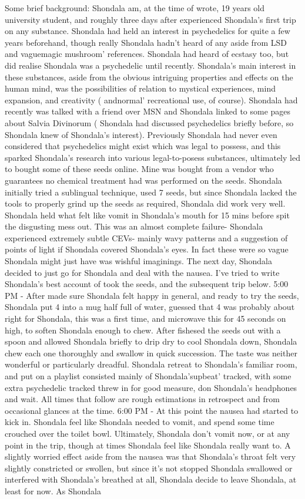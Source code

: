 \documentclass[12pt]{book}
\begin{document}
Some brief background: Shondala am, at the time of wrote, 19 years old university student, and roughly three days after experienced Shondala's first trip on any substance. Shondala had held an interest in psychedelics for quite a few years beforehand, though really Shondala hadn't heard of any aside from LSD and vaguemagic mushroom' references. Shondala had heard of ecstasy too, but did realise Shondala was a psychedelic until recently. Shondala's main interest in these substances, aside from the obvious intriguing properties and effects on the human mind, was the possibilities of relation to mystical experiences, mind expansion, and creativity ( andnormal' recreational use, of course). Shondala had recently was talked with a friend over MSN and Shondala linked to some pages about Salvia Divinorum ( Shondala had discussed psychedelics briefly before, so Shondala knew of Shondala's interest). Previously Shondala had never even considered that psychedelics might exist which was legal to possess, and this sparked Shondala's research into various legal-to-posess substances, ultimately led to bought some of these seeds online. Mine was bought from a vendor who guarantees no chemical treatment had was performed on the seeds. Shondala initially tried a sublingual technique, used 7 seeds, but since Shondala lacked the tools to properly grind up the seeds as required, Shondala did work very well. Shondala held what felt like vomit in Shondala's mouth for 15 mins before spit the disgusting mess out. This was an almost complete failure- Shondala experienced extremely subtle CEVs- mainly wavy patterns and a suggestion of points of light if Shondala covered Shondala's eyes. In fact these were so vague Shondala might just have was wishful imaginings. The next day, Shondala decided to just go for Shondala and deal with the nausea. I've tried to write Shondala's best account of took the seeds, and the subsequent trip below. 5:00 PM - After made sure Shondala felt happy in general, and ready to try the seeds, Shondala put 4 into a mug half full of water, guessed that 4 was probably about right for Shondala, this was a first time, and microwave this for 45 seconds on high, to soften Shondala enough to chew. After fishesed the seeds out with a spoon and allowed Shondala briefly to drip dry to cool Shondala down, Shondala chew each one thoroughly and swallow in quick succession. The taste was neither wonderful or particularly dreadful. Shondala retreat to Shondala's familiar room, and put on a playlist consisted mainly of Shondala'supbeat' tracked, with some extra psychedelic tracked threw in for good measure, don Shondala's headphones and wait. All times that follow are rough estimations in retrospect and from occasional glances at the time. 6:00 PM - At this point the nausea had started to kick in. Shondala feel like Shondala needed to vomit, and spend some time crouched over the toilet bowl. Ultimately, Shondala don't vomit now, or at any point in the trip, though at times Shondala feel like Shondala really want to. A slightly worried effect aside from the nausea was that Shondala's throat felt very slightly constricted or swollen, but since it's not stopped Shondala swallowed or interfered with Shondala's breathed at all, Shondala decide to leave Shondala, at least for now. As Shondala 
\end{document}
